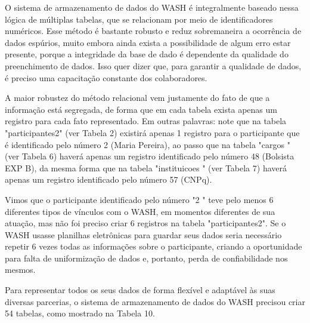 O sistema de armazenamento de dados do WASH é integralmente baseado nessa lógica de múltiplas tabelas, que se relacionam por meio de identificadores numéricos. Esse método é bastante robusto e reduz sobremaneira a ocorrência de dados espúrios, muito embora ainda exista a possibilidade de algum erro estar presente, porque a integridade da base de dado é dependente da qualidade do preenchimento de dados. Isso quer dizer que, para garantir a qualidade de dados, é preciso uma capacitação constante dos colaboradores.

A maior robustez do método relacional vem justamente do fato de que a informação está segregada, de forma que em cada tabela exista apenas um registro para cada fato representado. Em outras palavras: note que na tabela "participantes2" (ver Tabela 2) existirá apenas 1 registro para o participante que é identificado pelo número 2 (Maria Pereira), ao passo que na tabela "cargos " (ver Tabela 6) haverá apenas um registro identificado pelo número 48 (Bolsista EXP B), da mesma forma que na tabela "instituicoes " (ver Tabela 7) haverá apenas um registro identificado pelo número 57 (CNPq).

Vimos que o participante identificado pelo número "2 " teve  pelo menos 6 diferentes tipos de vínculos com o WASH, em momentos diferentes de sua atuação, mas não foi preciso criar 6 registros na tabela "participantes2". Se o WASH usasse planilhas eletrônicas para guardar seus dados seria necessário repetir 6 vezes todas as informações sobre o participante, criando a oportunidade para falta de uniformização de dados e, portanto, perda de confiabilidade nos mesmos.

Para representar todos os seus dados de forma flexível e adaptável às suas diversas parcerias, o sistema de armazenamento de dados do WASH precisou criar 54 tabelas, como mostrado na Tabela 10.





